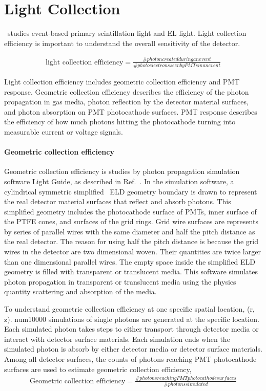 \section{Light Collection}
\gtest\ studies event-based primary scintillation light and EL light. Light collection efficiency is important to understand the overall sensitivity of the detector.  

\begin{align}
\text{light collection efficiency} = \frac{\# photon created during an event}{\# photoelectrons seen by PMTs in an event}
\end{align}

Light collection efficiency includes geometric collection efficiency and PMT response. Geometric collection efficiency describes the efficiency of the photon propagation in gas media, photon reflection by the detector material surfaces, and photon absorption on PMT photocathode surfaces. PMT response describes the efficiency of how much photons hitting the photocathode turning into measurable current or voltage signals.

\paragraph{Geometric collection efficiency} Geometric collection efficiency is studies by photon propagation simulation software Light Guide, as described in Ref.~\cite{Shutt2018}. In the simulation software, a cylindrical symmetric simplified \gtest\ ELD geometry boundary is drawn to represent the real detector material surfaces that reflect and absorb photons. This simplified geometry includes the photocathode surface of PMTs, inner surface of the PTFE cones, and surfaces of the grid rings. Grid wire surfaces are represents by series of parallel wires with the same diameter and half the pitch distance as the real detector. The reason for using half the pitch distance is because the grid wires in the detector are two dimensional woven. Their quantities are twice larger than one dimensional parallel wires. The empty space inside the simplified ELD geometry is filled with transparent or translucent media. This software simulates photon propagation in transparent or translucent media using the physics quantity scattering and absorption of the media. 

To understand geometric collection efficiency at one specific spatial location, (r, z). num{10000} simulations of single photons are generated at the specific location. Each simulated photon takes steps to either transport through detector media or interact with detector surface materials. Each simulation ends when the simulated photon is absorb by either detector media or detector surface materials. Among all detector surfaces, the counts of photons reaching PMT photocathode surfaces are used to estimate geometric collection efficiency,  
\begin{align}
	\text{Geometric collection efficiency} = \frac{\# photons reaching PMT photocathode surfaces}{\# photons simulated}
\end{align}

